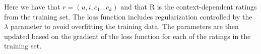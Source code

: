 Here we have that $r = (u,i,c_1...c_k)$ and that R is the context-dependent ratings from the training set.
The loss function includes regularization controlled by the $\lambda$ parameter to avoid overfitting the training data.
The parameters are then updated based on the gradient of the loss function for each of the ratings in the training set.
